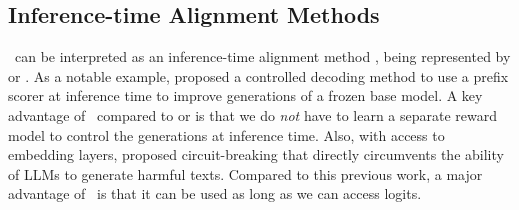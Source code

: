 \subsection{Inference-time Alignment Methods}

\algoshort~can be interpreted as an inference-time alignment method \cite{liang2024controllable}, being represented by \citet{mudgal24a} or \citet{deng2023reward}.
As a notable example, \citet{mudgal24a} proposed a controlled decoding method to use a prefix scorer at inference time to improve generations of a frozen base model.
A key advantage of \algoshort~compared to \citet{mudgal24a} or \citet{deng2023reward} is that we do \textit{not} have to learn a separate reward model to control the generations at inference time.
Also, with access to embedding layers, \citet{zou2024improving} proposed circuit-breaking that directly circumvents the ability of LLMs to generate harmful texts.
Compared to this previous work, a major advantage of \algoshort~is that it can be used as long as we can access logits.
